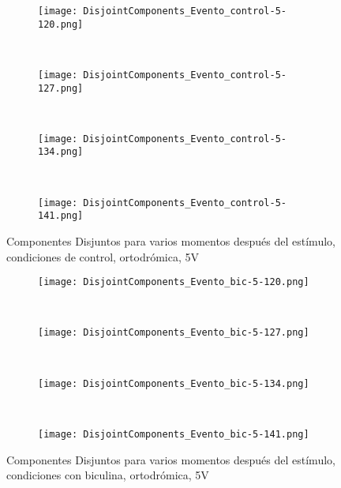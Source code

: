 \documentclass{article}
\begin{document}
\begin{figure}
  \centering
    \begin{subfigure}[b]{0.95\textwidth}
        \texttt{[image: DisjointComponents\_Evento\_control-5-120.png]}
    \end{subfigure}
    \\
     \begin{subfigure}[b]{0.95\textwidth}
        \texttt{[image: DisjointComponents\_Evento\_control-5-127.png]}
    \end{subfigure}
     \\
      \begin{subfigure}[b]{0.95\textwidth}
        \texttt{[image: DisjointComponents\_Evento\_control-5-134.png]}
    \end{subfigure}
      \\
       \begin{subfigure}[b]{0.95\textwidth}
        \texttt{[image: DisjointComponents\_Evento\_control-5-141.png]}
    \end{subfigure}
       \caption{Componentes Disjuntos para varios momentos después del estímulo, condiciones
         de control, ortodrómica, 5V}\label{cmcontrol}
\end{figure}

\begin{figure}
  \centering
    \begin{subfigure}[b]{0.95\textwidth}
        \texttt{[image: DisjointComponents\_Evento\_bic-5-120.png]}
    \end{subfigure}
    \\
     \begin{subfigure}[b]{0.95\textwidth}
        \texttt{[image: DisjointComponents\_Evento\_bic-5-127.png]}
    \end{subfigure}
     \\
      \begin{subfigure}[b]{0.95\textwidth}
        \texttt{[image: DisjointComponents\_Evento\_bic-5-134.png]}
    \end{subfigure}
      \\
       \begin{subfigure}[b]{0.95\textwidth}
        \texttt{[image: DisjointComponents\_Evento\_bic-5-141.png]}
    \end{subfigure}
       \caption{Componentes Disjuntos para varios momentos después del estímulo, condiciones
         con biculina, ortodrómica, 5V}\label{cmbic}
\end{figure}
\end{document}
